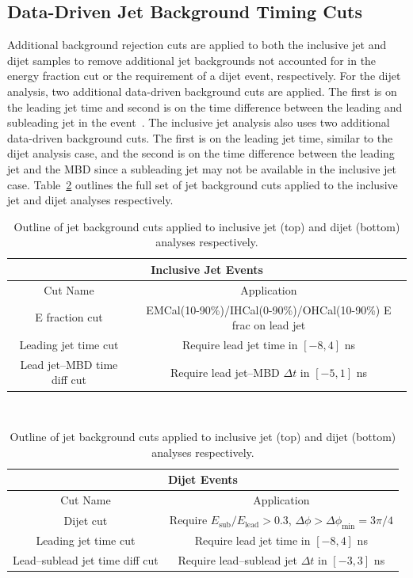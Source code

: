 \subsection{Data-Driven Jet Background Timing Cuts}
\label{sec:data_jet_timing}

Additional background rejection cuts are applied to both the inclusive jet and dijet samples to remove additional jet backgrounds not accounted for in the energy fraction cut or the requirement of a dijet event, respectively.
For the dijet analysis, two additional data-driven background cuts are applied. The first is on the leading jet time and second is on the time difference between the leading and subleading jet in the event~\cite{tf1_note}. 
The inclusive jet analysis also uses two additional data-driven background cuts. The first is on the leading jet time, similar to the dijet analysis case, and the second is on the time difference between the leading jet and the MBD since a subleading jet may not be available in the inclusive jet case. Table~\ref{tab:jet_background_cuts} outlines the full set of jet background cuts applied to the inclusive jet and dijet analyses respectively.

\begin{table}[]
    \centering
    \begin{tabular}{c|c}
        \multicolumn{2}{c}{Inclusive Jet Events} \\
        \hline
        Cut Name & Application \\
        \hline
        E fraction cut & EMCal(10-90\%)/IHCal(0-90\%)/OHCal(10-90\%) E frac on lead jet \\
        Leading jet time cut & Require lead jet time in $[-8,4]$ ns \\
        Lead jet--MBD time diff cut & Require lead jet--MBD $\Delta t$ in $[-5,1]$ ns \\
    \end{tabular} \\
    \bigskip \bigskip
    \begin{tabular}{c|c}
        \multicolumn{2}{c}{Dijet Events} \\
        \hline
        Cut Name & Application \\
        \hline
        Dijet cut & Require $E_{\mathrm{sub}}/E_{\mathrm{lead}}>0.3$, $\Delta\phi>\Delta\phi_{\mathrm{min}} = 3\pi / 4$ \\
        Leading jet time cut & Require lead jet time in $[-8,4]$ ns \\
        Lead--sublead jet time diff cut & Require lead--sublead jet $\Delta t$ in $[-3,3]$ ns \\
    \end{tabular}
    \caption{Outline of jet background cuts applied to inclusive jet (top) and dijet (bottom) analyses respectively.}
    \label{tab:jet_background_cuts}
\end{table}

